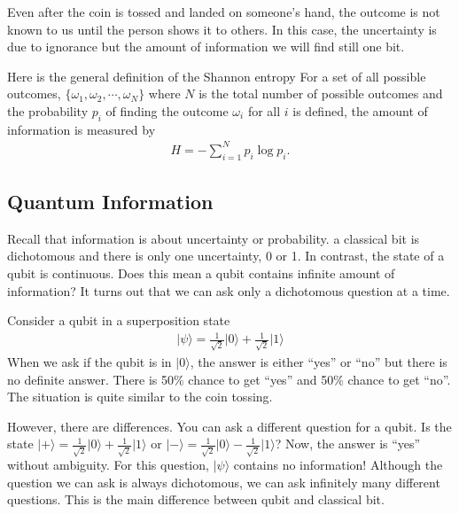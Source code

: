 \documentclass[letterpaper,10pt,english]{jupyterBook}
\begin{document}
\sphinxAtStartPar
Even after the coin is tossed and landed on someone’s hand,  the outcome is not known to us until the person shows it to others.  In this case, the uncertainty is due to ignorance but the amount of information we will find still one bit.

\sphinxAtStartPar
Here is the general definition of the Shannon entropy
For a set of all possible outcomes, \(\{\omega_1, \omega_2, \cdots, \omega_N\}\) where \(N\) is the total number of possible outcomes and the probability \(p_i\) of finding the outcome \(\omega_i\) for all \(i\) is defined,  the amount of  information  is measured by
\begin{equation*}
\begin{split}
H = - \sum_{i=1}^N p_i \log p_i.
\end{split}
\end{equation*}

\subsection{Quantum Information}
\label{\detokenize{computation/qinfo:quantum-information}}
\sphinxAtStartPar
Recall that information is about uncertainty or probability.  a classical bit is dichotomous and there is only one uncertainty, 0 or 1.  In contrast, the state of a qubit is continuous.  Does this mean a qubit contains infinite amount of information? It turns out that we can ask only a dichotomous question at a time.

\sphinxAtStartPar
Consider a qubit in a superposition state
\begin{equation*}
\begin{split}
\lvert \psi \rangle = \frac{1}{\sqrt{2}} \lvert 0 \rangle +  \frac{1}{\sqrt{2}} \lvert 1 \rangle
\end{split}
\end{equation*}
\sphinxAtStartPar
When we ask if the qubit is in \(\lvert 0 \rangle\), the answer is either “yes” or “no” but there is no definite answer.  There is 50\% chance to get “yes” and 50\% chance to get “no”.  The situation is quite similar to the coin tossing.

\sphinxAtStartPar
However, there are differences. You can ask a different question for a qubit.  Is the state \(\lvert + \rangle =  \frac{1}{\sqrt{2}} \lvert 0 \rangle +  \frac{1}{\sqrt{2}} \lvert 1 \rangle\) or \(\lvert - \rangle =  \frac{1}{\sqrt{2}} \lvert 0 \rangle -  \frac{1}{\sqrt{2}} \lvert 1 \rangle\)?   Now, the answer is “yes” without ambiguity.  For this question,  \(\lvert \psi \rangle\) contains no information!   Although the question we can ask is always dichotomous, we can ask infinitely many different questions.  This is the main difference between qubit and classical bit.
\end{document}
